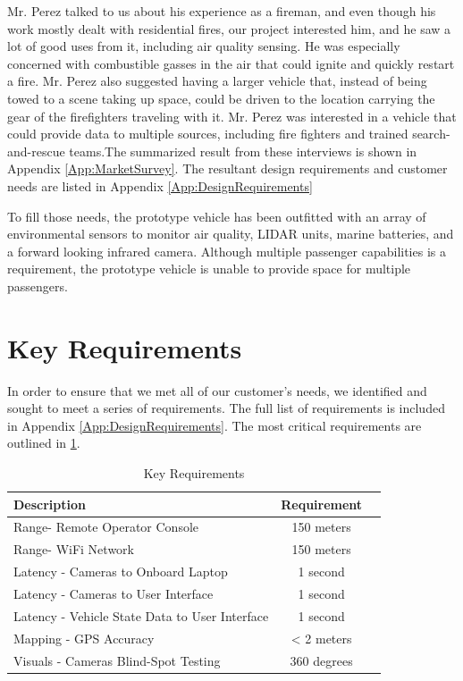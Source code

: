 Mr. Perez talked to us about his experience as a fireman, and even though his work mostly dealt with residential fires, our project interested him, and he saw a lot of good uses from it, including air quality sensing. He was especially concerned with combustible gasses in the air that could ignite and quickly restart a fire. Mr. Perez also suggested having a larger vehicle that, instead of being towed to a scene taking up space, could be driven to the location carrying the gear of the firefighters traveling with it. Mr. Perez was interested in a vehicle that could provide data to multiple sources, including fire fighters and trained search-and-rescue teams.The summarized result from these interviews is shown in Appendix \ref{App:MarketSurvey}. The resultant design requirements and customer needs are listed in Appendix \ref{App:DesignRequirements} 

To fill those needs, the prototype vehicle has been outfitted with an array of environmental sensors to monitor air quality, LIDAR units, marine batteries, and a forward looking infrared camera. Although multiple passenger capabilities is a requirement, the prototype vehicle is unable to provide space for multiple passengers.

\section{Key Requirements}
In order to ensure that we met all of our customer's needs, we identified and sought to meet a series of requirements. The full list of requirements is included in Appendix \ref{App:DesignRequirements}. The most critical requirements are outlined in \ref{table:key_reqs}.

\begin{table}[ht]
	\centering
	\begin{tabular}{ l | c | r }
		Description & Requirement  \\ \hline
		Range- Remote Operator Console & 150 meters  \\
		Range- WiFi Network & 150 meters \\
		Latency - Cameras to Onboard Laptop & 1 second \\
		Latency - Cameras to User Interface & 1 second \\
		Latency - Vehicle State Data to User Interface & 1 second \\
		Mapping - GPS Accuracy & < 2 meters \\
		Visuals - Cameras Blind-Spot Testing & 360 degrees \\
	\end{tabular}
	\caption{Key Requirements}
	\label{table:key_reqs}
\end{table}

